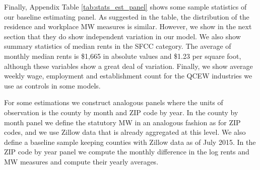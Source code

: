 Finally, Appendix Table \ref{tab:stats_est_panel} shows some sample statistics 
of our baseline estimating panel.
As suggested in the table, the distribution of the residence and workplace MW 
measures is similar.
However, we show in the next section that they do show independent variation
in our model.
We also show summary statistics of median rents in the SFCC category.
The average of monthly median rents is \$1,665 in absolute values and \$1.23 
per square foot, although these variables show a great deal of variation.
Finally, we show average weekly wage, employment and establishment count 
for the QCEW industries we use as controls in some models.

For some estimations we construct analogous panels where the units of 
observation is the county by month and ZIP code by year.
In the county by month panel we define the statutory MW in an analogous fashion 
as for ZIP codes, and we use Zillow data that is already aggregated at this 
level.
We also define a baseline sample keeping counties with Zillow data as of July
2015.
In the ZIP code by year panel we compute the monthly difference in the log rents 
and MW measures and compute their yearly averages.
